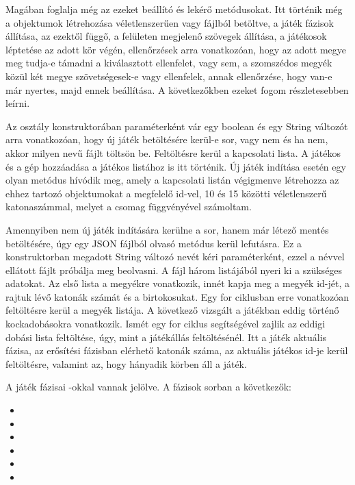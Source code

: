 Magában foglalja még az ezeket beállító és lekérő metódusokat.
Itt történik még a  objektumok létrehozása véletlenszerűen vagy fájlból betöltve, a játék fázisok állítása, az ezektől függő, a felületen megjelenő szövegek állítása, a játékosok léptetése az adott kör végén, ellenőrzések arra vonatkozóan, hogy az adott megye meg tudja-e támadni a kiválasztott ellenfelet, vagy sem, a szomszédos megyék közül két megye szövetségesek-e vagy ellenfelek, annak ellenőrzése, hogy van-e már nyertes, majd ennek beállítása.
A következőkben ezeket fogom részletesebben leírni. 

Az osztály konstruktorában paraméterként vár egy boolean és egy String változót arra vonatkozóan, hogy új játék betöltésére kerül-e sor, vagy nem és ha nem, akkor milyen nevű fájlt töltsön be.
Feltöltésre kerül a kapcsolati lista.
A játékos és a gép hozzáadása a játékos listához is itt történik.
Új játék indítása esetén egy olyan metódus hívódik meg, amely a kapcsolati listán végigmenve létrehozza az ehhez tartozó  objektumokat a megfelelő id-vel, 10 és 15 közötti véletlenszerű katonaszámmal, melyet a  csomag  függvényével számoltam. 

Amennyiben nem új játék indítására kerülne a sor, hanem már létező mentés betöltésére, úgy egy JSON fájlból olvasó metódus kerül lefutásra.
Ez a konstruktorban megadott String változó nevét kéri paraméterként, ezzel a névvel ellátott fájlt próbálja meg beolvasni.
A fájl három  listájából nyeri ki a szükséges adatokat.
Az első lista a megyékre vonatkozik, innét kapja meg a megyék id-jét, a rajtuk lévő katonák számát és a birtokosukat.
Egy for ciklusban erre vonatkozóan feltöltésre kerül a megyék listája.
A következő vizsgált  a játékban eddig történő kockadobásokra vonatkozik.
Ismét egy for ciklus segítségével zajlik az eddigi dobási lista feltöltése, úgy, mint a játékállás feltöltésénél. Itt a játék aktuális fázisa, az erősítési fázisban elérhető katonák száma, az aktuális játékos id-je kerül feltöltésre, valamint az, hogy hányadik körben áll a játék. 

A játék fázisai -okkal vannak jelölve.
A fázisok sorban a következők: 

\begin{itemize}
\setlength\itemsep{0em}
\item {}
\item {}
\item {}
\item {}
\item {}
\item {}
\end{itemize}

